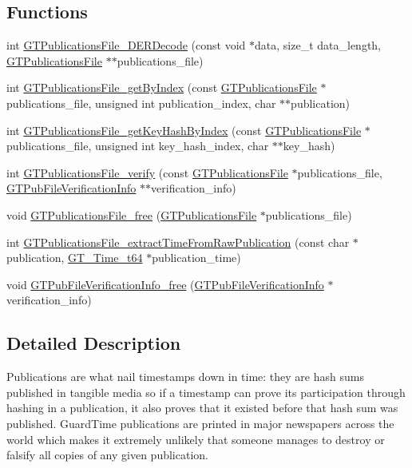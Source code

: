 \subsection*{Functions}
\begin{DoxyCompactItemize}
\item 
int \hyperlink{group__publications_ga2f0755e9ef1686ca255098a9c3f2de8a}{GTPublicationsFile\_\-DERDecode} (const void $\ast$data, size\_\-t data\_\-length, \hyperlink{group__publications_gacf561fdbce4067eb94bd9761a71e7e5a}{GTPublicationsFile} $\ast$$\ast$publications\_\-file)
\item 
int \hyperlink{group__publications_gac7154e5bda48840a583100dfa5a8393b}{GTPublicationsFile\_\-getByIndex} (const \hyperlink{group__publications_gacf561fdbce4067eb94bd9761a71e7e5a}{GTPublicationsFile} $\ast$publications\_\-file, unsigned int publication\_\-index, char $\ast$$\ast$publication)
\item 
int \hyperlink{group__publications_ga37390311c583fe0ecc6871db4b4b8f05}{GTPublicationsFile\_\-getKeyHashByIndex} (const \hyperlink{group__publications_gacf561fdbce4067eb94bd9761a71e7e5a}{GTPublicationsFile} $\ast$publications\_\-file, unsigned int key\_\-hash\_\-index, char $\ast$$\ast$key\_\-hash)
\item 
int \hyperlink{group__publications_gac3eccc436ce6e5114346b9135b616fc9}{GTPublicationsFile\_\-verify} (const \hyperlink{group__publications_gacf561fdbce4067eb94bd9761a71e7e5a}{GTPublicationsFile} $\ast$publications\_\-file, \hyperlink{struct_g_t_pub_file_verification_info__st}{GTPubFileVerificationInfo} $\ast$$\ast$verification\_\-info)
\item 
void \hyperlink{group__publications_ga585049b56c3445dab5b099b98734693c}{GTPublicationsFile\_\-free} (\hyperlink{group__publications_gacf561fdbce4067eb94bd9761a71e7e5a}{GTPublicationsFile} $\ast$publications\_\-file)
\item 
int \hyperlink{group__publications_ga2de8433bddcaf74efc7d90f6ab1d52f7}{GTPublicationsFile\_\-extractTimeFromRawPublication} (const char $\ast$publication, \hyperlink{group__common_ga4cc54826c21e0ed438d8e35be7039328}{GT\_\-Time\_\-t64} $\ast$publication\_\-time)
\item 
void \hyperlink{group__publications_gaea9337f5fb77d0bc0f9c1159c369df61}{GTPubFileVerificationInfo\_\-free} (\hyperlink{struct_g_t_pub_file_verification_info__st}{GTPubFileVerificationInfo} $\ast$verification\_\-info)
\end{DoxyCompactItemize}


\subsection{Detailed Description}
Publications are what nail timestamps down in time: they are hash sums published in tangible media so if a timestamp can prove its participation through hashing in a publication, it also proves that it existed before that hash sum was published. GuardTime publications are printed in major newspapers across the world which makes it extremely unlikely that someone manages to destroy or falsify all copies of any given publication.

